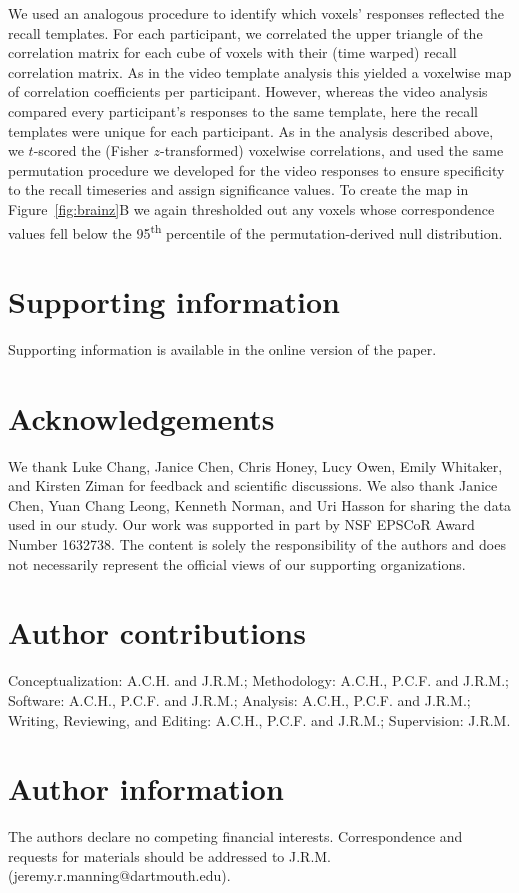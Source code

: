 \documentclass{article}
\begin{document}
We used an analogous procedure to identify which voxels' responses reflected the recall templates.  For each participant, we correlated the upper triangle of the correlation matrix for each cube of voxels with their (time warped) recall correlation matrix.  As in the video template analysis this yielded a voxelwise map of correlation coefficients per participant.  However, whereas the video analysis compared every participant's responses to the same template, here the recall templates were unique for each participant.  As in the analysis described above, we $t$-scored the (Fisher $z$-transformed) voxelwise correlations, and used the same permutation procedure we developed for the video responses to ensure specificity to the recall timeseries and assign significance values.  To create the map in Figure~\ref{fig:brainz}B we again thresholded out any voxels whose correspondence values fell below the 95\textsuperscript{th} percentile of the permutation-derived null distribution.


% 

\section*{Supporting information}
Supporting information is available in the online version of the paper.

\section*{Acknowledgements}
We thank Luke Chang, Janice Chen, Chris Honey, Lucy Owen, Emily Whitaker, and Kirsten Ziman for feedback and scientific discussions. We also thank Janice Chen, Yuan Chang Leong, Kenneth Norman, and Uri Hasson for sharing the data used in our study.  Our work was supported in part by NSF EPSCoR Award Number 1632738. The content is solely the responsibility of the authors and does not necessarily represent the official views of our supporting organizations.

\section*{Author contributions}
Conceptualization: A.C.H. and J.R.M.; Methodology: A.C.H., P.C.F. and J.R.M.; Software: A.C.H., P.C.F. and J.R.M.; Analysis: A.C.H., P.C.F. and J.R.M.; Writing, Reviewing, and Editing: A.C.H., P.C.F. and J.R.M.; Supervision: J.R.M.

\section*{Author information}
The authors declare no competing financial interests.  Correspondence and requests for materials should be addressed to J.R.M. (jeremy.r.manning@dartmouth.edu).
\end{document}
